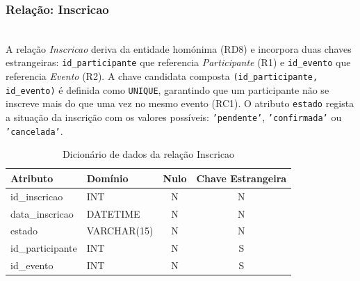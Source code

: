 \documentclass[runningheads]{llncs}
\begin{document}
                \vspace{0.3cm}
                \noindent\begin{minipage}{\textwidth}
                \subsubsection{Relação: Inscricao}\mbox{}\\

                A relação \textit{Inscricao} deriva da entidade homónima (RD8) e incorpora duas
                chaves estrangeiras: \texttt{id\_participante} que referencia
                \textit{Participante} (R1) e \texttt{id\_evento} que referencia \textit{Evento}
                (R2). A chave candidata composta \texttt{(id\_participante, id\_evento)} é
                definida como \texttt{UNIQUE}, garantindo que um participante não se inscreve
                mais do que uma vez no mesmo evento (RC1). O atributo \texttt{estado} regista a
                situação da inscrição com os valores possíveis: \texttt{'pendente'},
                \texttt{'confirmada'} ou \texttt{'cancelada'}.

                \begin{table}[H]
                \centering
                \renewcommand{\arraystretch}{1.4}
                \begin{tabular}{|l|l|c|c|}
                \hline
                \textbf{Atributo} & \textbf{Domínio} & \textbf{Nulo} & \textbf{Chave Estrangeira} \\ \hline
                id\_inscricao    & INT          & N & N \\ \hline
                data\_inscricao  & DATETIME     & N & N \\ \hline
                estado           & VARCHAR(15)  & N & N \\ \hline
                id\_participante & INT          & N & S \\ \hline
                id\_evento       & INT          & N & S \\ \hline
                \end{tabular}
                \vspace{0.2cm}
                \caption{Dicionário de dados da relação Inscricao}
                \label{tab:dic_inscricao}
                \end{table}
                \end{minipage}
\end{document}
